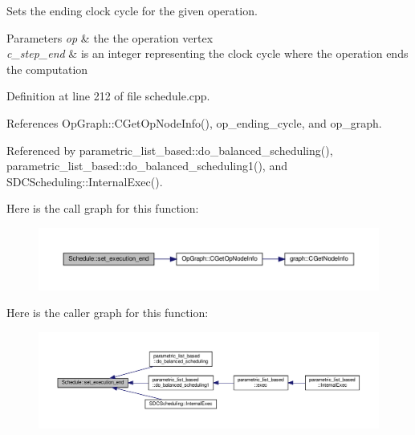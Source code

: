 Sets the ending clock cycle for the given operation. 


\begin{DoxyParams}{Parameters}
{\em op} & the the operation vertex \\
\hline
{\em c\+\_\+step\+\_\+end} & is an integer representing the clock cycle where the operation ends the computation \\
\hline
\end{DoxyParams}


Definition at line 212 of file schedule.\+cpp.



References Op\+Graph\+::\+C\+Get\+Op\+Node\+Info(), op\+\_\+ending\+\_\+cycle, and op\+\_\+graph.



Referenced by parametric\+\_\+list\+\_\+based\+::do\+\_\+balanced\+\_\+scheduling(), parametric\+\_\+list\+\_\+based\+::do\+\_\+balanced\+\_\+scheduling1(), and S\+D\+C\+Scheduling\+::\+Internal\+Exec().

Here is the call graph for this function\+:
\nopagebreak
\begin{figure}[H]
\begin{center}
\leavevmode
\includegraphics[width=350pt]{df/d61/classSchedule_a1c75a65910f1d1b9cf3e9f27e91a756e_cgraph}
\end{center}
\end{figure}
Here is the caller graph for this function\+:
\nopagebreak
\begin{figure}[H]
\begin{center}
\leavevmode
\includegraphics[width=350pt]{df/d61/classSchedule_a1c75a65910f1d1b9cf3e9f27e91a756e_icgraph}
\end{center}
\end{figure}
\mbox{\label{classSchedule_af9a710c306cf7d06428bc10da109d4ee}} 
